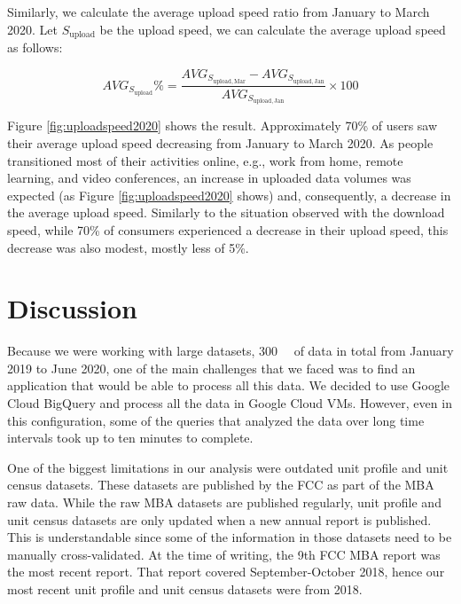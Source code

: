 \documentclass[conference,10pt]{IEEEtran}
\begin{document}
Similarly, we calculate the average upload speed ratio from January to March 2020. Let $S_{\text{upload}}$ be the upload speed, we can calculate the average upload speed as follows:

\begin{equation}
AVG_{S_{\text{upload}}}\% = \frac{AVG_{S_{\text{upload},\, \text{Mar}}}-AVG_{S_{\text{upload},\, \text{Jan}}}}{AVG_{S_{\text{upload},\, \text{Jan}}}}\times 100
\end{equation}


Figure \ref{fig:uploadspeed2020} shows the result. Approximately 70\% of users saw their average upload speed decreasing from January to March 2020. As people transitioned most of their activities online, e.g., work from home, remote learning, and video conferences, an increase in uploaded data volumes was expected (as Figure \ref{fig:uploadspeed2020} shows) and, consequently, a decrease in the average upload speed. Similarly to the situation observed with the download speed, while 70\% of consumers experienced a decrease in their upload speed, this decrease was also modest, mostly less of 5\%.




\section{Discussion}
\label{sec:discussion}

Because we were working with large datasets, \SI{300}{\giga\byte} of data in total from January 2019 to June 2020, one of the main challenges that we faced was to find an application that would be able to process all this data. We decided to use Google Cloud BigQuery and process all the data in Google Cloud VMs. However, even in this configuration, some of the queries that analyzed the data over long time intervals took up to ten minutes to complete.

One of the biggest limitations in our analysis were outdated unit profile and unit census datasets. These datasets are published by the FCC as part of the MBA raw data. While the raw MBA datasets are published regularly, unit profile and unit census datasets are only updated when a new annual report is published. This is understandable since some of the information in those datasets need to be manually cross-validated. At the time of writing, the 9th FCC MBA report was the most recent report. That report covered September-October 2018, hence our most recent unit profile and unit census datasets were from 2018.
\end{document}
